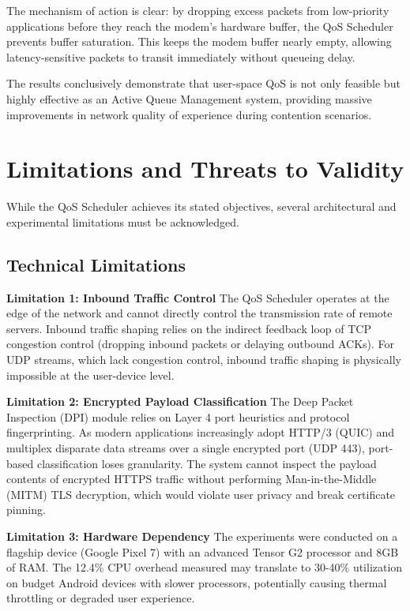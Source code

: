 The mechanism of action is clear: by dropping excess packets from low-priority applications before they reach the modem's hardware buffer, the QoS Scheduler prevents buffer saturation. This keeps the modem buffer nearly empty, allowing latency-sensitive packets to transit immediately without queueing delay.

The results conclusively demonstrate that user-space QoS is not only feasible but highly effective as an Active Queue Management system, providing massive improvements in network quality of experience during contention scenarios.

\section{Limitations and Threats to Validity}
\label{sec:limitations_threats}

While the QoS Scheduler achieves its stated objectives, several architectural and experimental limitations must be acknowledged.

\subsection{Technical Limitations}

\textbf{Limitation 1: Inbound Traffic Control}
The QoS Scheduler operates at the edge of the network and cannot directly control the transmission rate of remote servers. Inbound traffic shaping relies on the indirect feedback loop of TCP congestion control (dropping inbound packets or delaying outbound ACKs). For UDP streams, which lack congestion control, inbound traffic shaping is physically impossible at the user-device level.

\textbf{Limitation 2: Encrypted Payload Classification}
The Deep Packet Inspection (DPI) module relies on Layer 4 port heuristics and protocol fingerprinting. As modern applications increasingly adopt HTTP/3 (QUIC) and multiplex disparate data streams over a single encrypted port (UDP 443), port-based classification loses granularity. The system cannot inspect the payload contents of encrypted HTTPS traffic without performing Man-in-the-Middle (MITM) TLS decryption, which would violate user privacy and break certificate pinning.

\textbf{Limitation 3: Hardware Dependency}
The experiments were conducted on a flagship device (Google Pixel 7) with an advanced Tensor G2 processor and 8GB of RAM. The 12.4\% CPU overhead measured may translate to 30-40\% utilization on budget Android devices with slower processors, potentially causing thermal throttling or degraded user experience.

